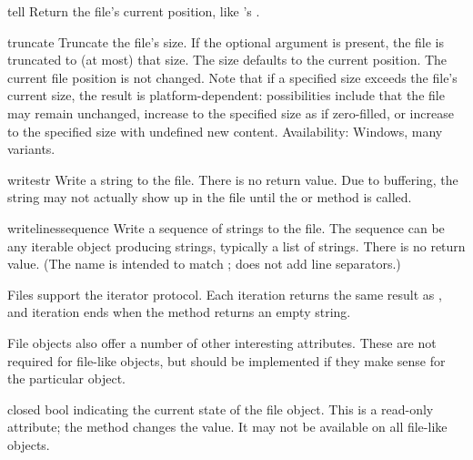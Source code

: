 \begin{methoddesc}[file]{tell}{}
  Return the file's current position, like 's
  .

\end{methoddesc}

\begin{methoddesc}[file]{truncate}{}
  Truncate the file's size.  If the optional  argument is
  present, the file is truncated to (at most) that size.  The size
  defaults to the current position.  The current file position is
  not changed.  Note that if a specified size exceeds the file's
  current size, the result is platform-dependent:  possibilities
  include that the file may remain unchanged, increase to the specified
  size as if zero-filled, or increase to the specified size with
  undefined new content.
  Availability:  Windows, many \UNIX{} variants.
\end{methoddesc}

\begin{methoddesc}[file]{write}{str}
  Write a string to the file.  There is no return value.  Due to
  buffering, the string may not actually show up in the file until
  the  or  method is called.
\end{methoddesc}

\begin{methoddesc}[file]{writelines}{sequence}
  Write a sequence of strings to the file.  The sequence can be any
  iterable object producing strings, typically a list of strings.
  There is no return value.
  (The name is intended to match ;
   does not add line separators.)
\end{methoddesc}


Files support the iterator protocol.  Each iteration returns the same
result as , and iteration ends when the
 method returns an empty string.


File objects also offer a number of other interesting attributes.
These are not required for file-like objects, but should be
implemented if they make sense for the particular object.

\begin{memberdesc}[file]{closed}
bool indicating the current state of the file object.  This is a
read-only attribute; the  method changes the value.
It may not be available on all file-like objects.
\end{memberdesc}

